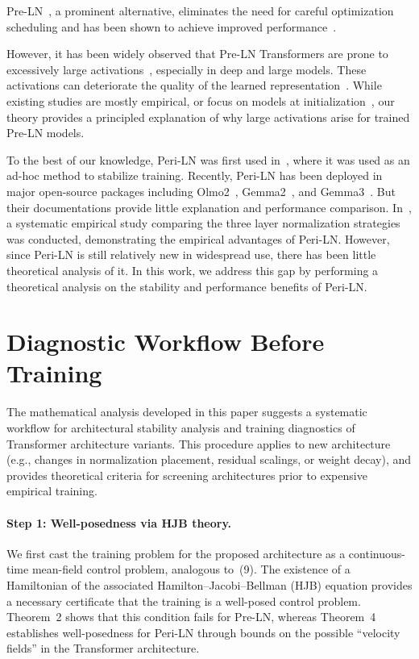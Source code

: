 \documentclass[journal]{IEEEtran}
\theoremstyle{plain}
\theoremstyle{definition}
\theoremstyle{remark}
\begin{document}
Pre-LN~\cite{baevski2018adaptive,child2019generating,wang-etal-2019-learning-deep}, a prominent alternative, eliminates the need for careful optimization scheduling and has been shown to achieve improved performance~\cite{nguyen-salazar-2019-Transformers,xiong2020layer}. 

However, it has been widely observed that Pre-LN Transformers are prone to excessively large activations~\cite{dettmers2022gptint,yu2024super,sun2024massive,fishman2025scaling,kim2025peri}, especially in deep and large models. These activations can deteriorate the quality of the learned representation~\cite{kim2025peri}. While existing studies are mostly empirical, or focus on models at initialization~\cite{xiong2020layer,kedia2024Transformers}, our theory provides a principled explanation of why large activations arise for trained Pre-LN models.

To the best of our knowledge, Peri-LN was first used in~\cite{ding2021cogview}, where it was used as an ad-hoc method to stabilize training. Recently, Peri-LN has been deployed in major open-source packages including Olmo2~\cite{OLMo2}, Gemma2~\cite{Gemma2}, and Gemma3~\cite{team2025gemma}. But their documentations provide little explanation and performance comparison. In~\cite{kim2025peri}, a systematic empirical study comparing the three layer normalization strategies was conducted, demonstrating the empirical advantages of Peri-LN. However, since Peri-LN is still relatively new in widespread use, there has been little theoretical analysis of it. In this work, we address this gap by performing a theoretical analysis on the stability and performance benefits of Peri-LN.

\section{Diagnostic Workflow Before Training}
\label{sec:workflow}


The mathematical analysis developed in this paper suggests a systematic workflow for architectural stability analysis and training diagnostics of Transformer architecture variants. This procedure applies to new architecture (e.g., changes in normalization placement, residual scalings, or weight decay), and provides theoretical criteria for screening architectures prior to expensive empirical training.

\paragraph{Step 1: Well-posedness via HJB theory.} 
We first cast the training problem for the proposed architecture as a continuous-time mean-field control problem, analogous to~(9). The existence of a Hamiltonian 
of the associated Hamilton–Jacobi–Bellman (HJB) equation provides a necessary certificate that the training is a well-posed control problem. Theorem~2 shows that this condition fails for Pre-LN, whereas Theorem~4 establishes well-posedness for Peri-LN through bounds on the possible ``velocity fields'' in the Transformer architecture.
\end{document}
